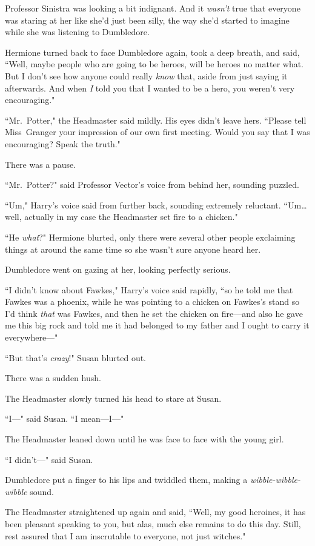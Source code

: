 Professor Sinistra was looking a bit indignant. And it \emph{wasn't} true that everyone was staring at her like she'd just been silly, the way she'd started to imagine while she was listening to Dumbledore.

Hermione turned back to face Dumbledore again, took a deep breath, and said, ``Well, maybe people who are going to be heroes, will be heroes no matter what. But I don't see how anyone could really \emph{know} that, aside from just saying it afterwards. And when \emph{I} told you that I wanted to be a hero, you weren't very encouraging."

``Mr.~Potter," the Headmaster said mildly. His eyes didn't leave hers. ``Please tell Miss~Granger your impression of our own first meeting. Would you say that I was encouraging? Speak the truth."

There was a pause.

``Mr.~Potter?" said Professor Vector's voice from behind her, sounding puzzled.

``Um," Harry's voice said from further back, sounding extremely reluctant. ``Um{\ldots} well, actually in my case the Headmaster set fire to a chicken."

``He \emph{what}?" Hermione blurted, only there were several other people exclaiming things at around the same time so she wasn't sure anyone heard her.

Dumbledore went on gazing at her, looking perfectly serious.

``I didn't know about Fawkes," Harry's voice said rapidly, ``so he told me that Fawkes was a phoenix, while he was pointing to a chicken on Fawkes's stand so I'd think \emph{that} was Fawkes, and then he set the chicken on fire---and also he gave me this big rock and told me it had belonged to my father and I ought to carry it everywhere---"

``But that's \emph{crazy}!" Susan blurted out.

There was a sudden hush.

The Headmaster slowly turned his head to stare at Susan.

``I---" said Susan. ``I mean---I---"

The Headmaster leaned down until he was face to face with the young girl.

``I didn't---" said Susan.

Dumbledore put a finger to his lips and twiddled them, making a \emph{wibble-wibble-wibble} sound.

The Headmaster straightened up again and said, ``Well, my good heroines, it has been pleasant speaking to you, but alas, much else remains to do this day. Still, rest assured that I am inscrutable to everyone, not just witches."

